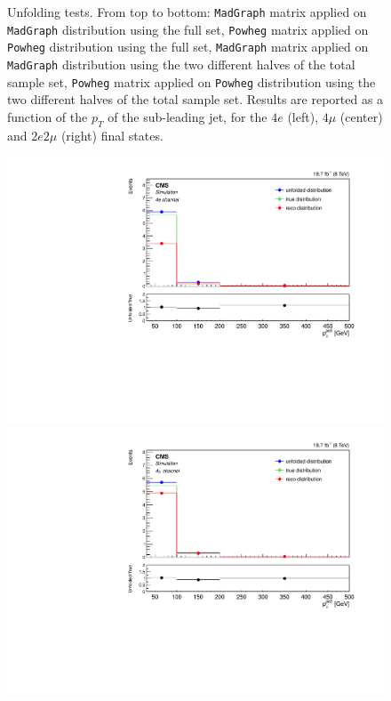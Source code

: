 \begin{figure}[hbtp]
\begin{center}
      \caption{Unfolding tests. From top to bottom: \texttt{MadGraph} matrix applied on \texttt{MadGraph} distribution using the full set, \texttt{Powheg} matrix applied on \texttt{Powheg} distribution using the full set,  \texttt{MadGraph} matrix applied on \texttt{MadGraph} distribution using the two different halves of the total sample set, \texttt{Powheg} matrix applied on \texttt{Powheg} distribution using the two different halves of the total sample set. Results are reported as a function of the $p_T$ of the sub-leading jet, for the $4e$ (left), $4\mu$ (center) and $2e2\mu$ (right) final states.}
    \label{fig:MCtest_PtJet21}
  \end{center}
\end{figure}

\begin{figure}[hbtp]
  \begin{center}
    \includegraphics[width=0.8\cmsFigWidth]{Figures/Unfolding/MCTests/PtJet2_ZZTo4e_MadMatrix_PowDistr_FullSample_fr}     
    \includegraphics[width=0.8\cmsFigWidth]{Figures/Unfolding/MCTests/PtJet2_ZZTo4m_MadMatrix_PowDistr_FullSample_fr}     

\end{center}
\end{figure}
